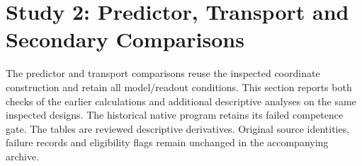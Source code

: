 \section{Study 2: Predictor, Transport and Secondary Comparisons}
\label{app:reproduction}
The predictor and transport comparisons reuse the inspected coordinate construction and retain all model/readout conditions. This section reports both checks of the earlier calculations and additional descriptive analyses on the same inspected designs. The historical native program retains its failed competence gate. The tables are reviewed descriptive derivatives. Original source identities, failure records and eligibility flags remain unchanged in the accompanying archive.


\FloatBarrier

\Needspace{0.55\textheight}
